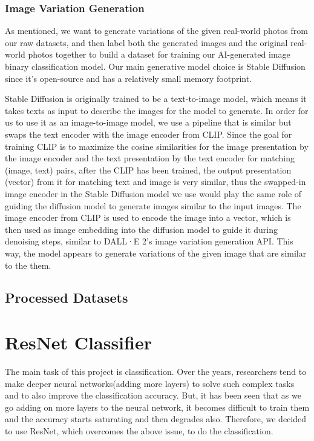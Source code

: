 \documentclass[11pt]{article}
\begin{document}
\subsubsection{Image Variation Generation}

As mentioned, we want to generate variations of the given real-world photos from our raw datasets, and then label both the generated images and the original real-world photos together to build a dataset for training our AI-generated image binary classification model. Our main generative model choice is Stable Diffusion since it's open-source and has a relatively small memory footprint.

Stable Diffusion is originally trained to be a text-to-image model, which means it takes texts as input to describe the images for the model to generate. In order for us to use it as an image-to-image model, we use a pipeline that is similar but swaps the text encoder with the image encoder from CLIP. Since the goal for training CLIP is to maximize the cosine similarities for the image presentation by the image encoder and the text presentation by the text encoder for matching (image, text) pairs, after the CLIP has been trained, the output presentation (vector) from it for matching text and image is very similar, thus the swapped-in image encoder in the Stable Diffusion model we use would play the same role of guiding the diffusion model to generate images similar to the input images. The image encoder from CLIP is used to encode the image into a vector, which is then used as image embedding into the diffusion model to guide it during denoising steps, similar to DALL·E 2's image variation generation API. This way, the model appears to generate variations of the given image that are similar to the them.

\subsection{Processed Datasets}

\section{ResNet Classifier}

The main task of this project is classification. Over the years, researchers tend to make deeper neural networks(adding more layers) to solve such complex tasks and to also improve the classification accuracy. But, it has been seen that as we go adding on more layers to the neural network, it becomes difficult to train them and the accuracy starts saturating and then degrades also. Therefore, we decided to use ResNet, which overcomes the above issue, to do the classification.
\end{document}
